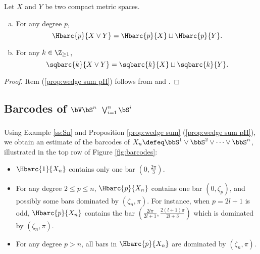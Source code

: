 \medskip\proposition
Let $X$ and $Y$ be two compact metric spaces.
\begin{enumerate}[(a)]
	\item\label{prop:wedge sum pH} For any degree $p$,
	\begin{equation*}\label{eq:wedge sum pH}
		\Hbarc{p}{X\vee Y}= \Hbarc{p}{X}\sqcup \Hbarc{p}{Y}.
	\end{equation*}
	\item\label{prop:wedge sum Sq} For any $k\in \Z_{\geq 1}$,
	\begin{equation*}\label{eq:wedge sum Sq}
		\sqbarc{k}{X\vee Y}= \sqbarc{k}{X}\sqcup \sqbarc{k}{Y}.
	\end{equation*}
\end{enumerate}

\begin{proof}
	Item (\ref{prop:wedge sum pH}) follows from \cite[Proposition 3.7]{adamaszek2020homotopy} and \cite[Thoerem 9 (2)]{lim2020vietoris}.
	
\end{proof}

\subsection{Barcodes of $\bV\bS^n$ $\bigvee_{i=1}^n \bS^i$}

\subsubsection{} Using Example \ref{ss:Sn} and Proposition \ref{prop:wedge sum} (\ref{prop:wedge sum pH}), we obtain an estimate of the barcodes of $X_n \defeq \bbS^1\vee\bbS^2\vee\dots\vee\bbS^n$, illustrated in the top row of Figure \ref{fig:barcodes}:
\begin{itemize}
	\item $\Hbarc{1}{X_n}$ contains only one bar $\left(0,\frac{2\pi}{3}\right)$.
	\item For any degree $2\leq p\leq n$, $\Hbarc{p}{X_n}$ contains one bar $(0,\zeta_p)$, and possibly some bars dominated by $(\zeta_n,\pi)$.
	For instance, when $p=2l+1$ is odd, $\Hbarc{p}{X_n}$ contains the bar $( \frac{2l\pi}{2l+1},\frac{2(l+1)\pi}{2l+3})$ which is dominated by $(\zeta_n,\pi)$.
	\item For any degree $p>n$, all bars in $\Hbarc{p}{X_n}$ are dominated by $(\zeta_n,\pi)$.
\end{itemize}

